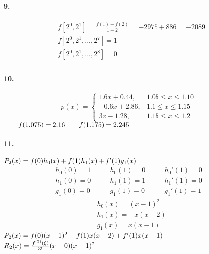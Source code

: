 \documentclass[UTF8]{ctexart}
\begin{document}
	\paragraph{9.}
		\begin{displaymath}
		\begin{aligned}
			&f[2^0, 2^1]=\frac{f(1)-f(2)}{1-2}=-2975+886=-2089\\
			&f[2^0, 2^1, ..., 2^7]=1\\
			&f[2^0, 2^1, ..., 2^8]=0\\
		\end{aligned}
		\end{displaymath}
	
	\paragraph{10.}
		\begin{equation}
			p(x)=\left\{
				\begin{array}{lr}
					1.6x+0.44,&1.05\leq x \leq 1.10\\
					-0.6x+2.86,&1.1\leq x \leq 1.15\\
					3x-1.28,&1.15\leq x\leq 1.2
				\end{array}
			\right.
		\end{equation}
		$\qquad f(1.075)=2.16\\
		\qquad f(1.175)=2.245\\$
		
	\paragraph{11.}
		$P_2(x)=f(0)h_0(x)+f(1)h_1(x)+f'(1)g_1(x)\\$
		\begin{displaymath}
		\begin{aligned}
			h_0(0)=1\qquad&h_0(1)=0\qquad&h_0'(1)=0\\
			h_1(0)=0\qquad&h_1(1)=1\qquad&h_1'(1)=0\\
			g_1(0)=0\qquad&g_1(1)=0\qquad&g_1'(1)=1
		\end{aligned}
		\end{displaymath}
		\begin{displaymath}
		\begin{aligned}
			&h_0(x)=(x-1)^2\\
			&h_1(x)=-x(x-2)\\
			&g_1(x)=x(x-1)
		\end{aligned}
		\end{displaymath}
		$P_2(x)=f(0)(x-1)^2-f(1)x(x-2)+f'(1)x(x-1)\\$
		$R_2(x)=\frac{f^{(3)}(\xi)}{3!}(x-0)(x-1)^2\\$
		
\end{document}
